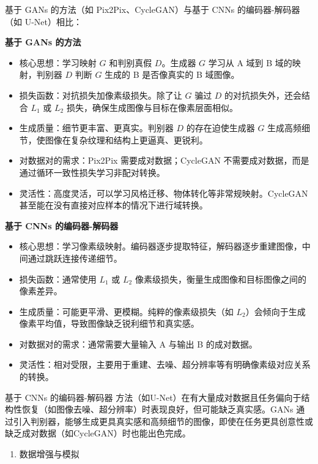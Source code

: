 基于 GANs 的方法（如 Pix2Pix、CycleGAN）与基于 CNNs 的编码器-解码器（如 U-Net）相比：

\textbf{基于 GANs 的方法}

\begin{itemize}
\tightlist
\item
  核心思想：学习映射 \(G\) 和判别真假 \(D\)。生成器 \(G\) 学习从 A 域到 B 域的映射，判别器 \(D\) 判断 \(G\) 生成的 B 是否像真实的 B 域图像。
\item
  损失函数：对抗损失加像素级损失。除了让 \(G\) 骗过 \(D\) 的对抗损失外，还会结合 \(L_1\) 或 \(L_2\) 损失，确保生成图像与目标在像素层面相似。
\item
  生成质量：细节更丰富、更真实。判别器 \(D\) 的存在迫使生成器 \(G\) 生成高频细节，使图像在复杂纹理和结构上更逼真、更锐利。
\item
  对数据对的需求：Pix2Pix 需要成对数据；CycleGAN 不需要成对数据，而是通过循环一致性损失学习非配对转换。
\item
  灵活性：高度灵活，可以学习风格迁移、物体转化等非常规映射。CycleGAN 甚至能在没有直接对应样本的情况下进行域转换。
\end{itemize}

\textbf{基于 CNNs 的编码器-解码器}

\begin{itemize}
\tightlist
\item
  核心思想：学习像素级映射。编码器逐步提取特征，解码器逐步重建图像，中间通过跳跃连接传递细节。
\item
  损失函数：通常使用 \(L_1\) 或 \(L_2\) 像素级损失，衡量生成图像和目标图像之间的像素差异。
\item
  生成质量：可能更平滑、更模糊。纯粹的像素级损失（如 \(L_2\)）会倾向于生成像素平均值，导致图像缺乏锐利细节和真实感。
\item
  对数据对的需求：通常需要大量输入 A 与输出 B 的成对数据。
\item
  灵活性：相对受限，主要用于重建、去噪、超分辨率等有明确像素级对应关系的转换。
\end{itemize}

基于 CNNs 的编码器-解码器 方法（如U-Net）在有大量成对数据且任务偏向于结构性恢复（如图像去噪、超分辨率）时表现良好，但可能缺乏真实感。GANs 通过引入判别器，能够生成更具真实感和高频细节的图像，即使在任务更具创意性或缺乏成对数据（如CycleGAN）时也能出色完成。

\begin{enumerate}
\def\labelenumi{\arabic{enumi}.}
\setcounter{enumi}{2}
\tightlist
\item
  数据增强与模拟
\end{enumerate}

